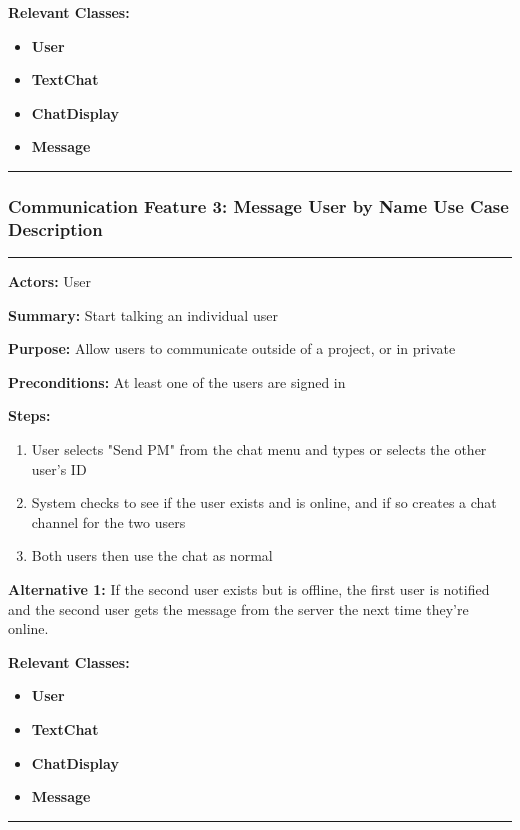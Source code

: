 \documentclass[twoside,letterpaper]{article}
\begin{document}
	
	\noindent\textbf{Relevant Classes:}
	\begin{itemize}
		\item \textbf{User}
		\item \textbf{TextChat}
		\item \textbf{ChatDisplay}
		\item \textbf{Message}
	\end{itemize}
	\hrule
	\newpage

	
	\subsubsection[Communication Feature 3: Message User by Name Use Case Description]{\rmfamily\bfseries\color{black}
		Communication Feature 3: Message User by Name Use Case Description}
	\hypertarget{RefHeading22059017292}{}
	
	\vspace{2pt}
	\hrule
	\vspace{8pt}
	\textbf{Actors:} User \newline
	
	\noindent\textbf{Summary:} Start talking an individual user \newline
	
	\noindent\textbf{Purpose:} Allow users to communicate outside of a project, or in private \newline
	
	\noindent\textbf{Preconditions:} At least one of the users are signed in \newline
	
	\noindent\textbf{Steps:} \begin{enumerate}
		\item User selects "Send PM" from the chat menu and types or selects the other user's ID
		\item System checks to see if the user exists and is online, and if so creates a chat channel for the two users
		\item Both users then use the chat as normal
	\end{enumerate}
	\noindent\textbf{Alternative 1:} If the second user exists but is offline, the first user is notified and the second user gets the message from the server the next time they're online. \newline
	
	
	\noindent\textbf{Relevant Classes:}
	\begin{itemize}
		\item \textbf{User}
		\item \textbf{TextChat}
		\item \textbf{ChatDisplay}
		\item \textbf{Message}
	\end{itemize}
	\hrule
	\newpage
\end{document}
